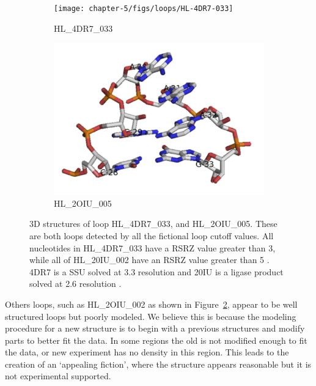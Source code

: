 \begin{figure}
  \begin{subfigure}[b]{0.45\textwidth}
    \texttt{[image: chapter-5/figs/loops/HL-4DR7-033]}
    \caption{HL\_4DR7\_033}
    \label{fig:hl-4dr7-033}
  \end{subfigure}
  \begin{subfigure}[b]{0.45\textwidth}
    \includegraphics[width=\textwidth]{chapter-5/figs/loops/HL-2OIU-005}
    \caption{HL\_2OIU\_005}
    \label{fig:hl-2oiu-002}
  \end{subfigure}
  \caption{3D structures of loop HL\_4DR7\_033, and HL\_2OIU\_005. These are
    both loops detected by all the fictional loop cutoff values. All nucleotides
    in HL\_4DR7\_033 have a RSRZ value greater than 3, while all of HL\_20IU\_002
    have an RSRZ value greater than 5 . 4DR7 is a \TT{} SSU solved at
    3.3\angstrom{} resolution \cite{Demirci2013} and 20IU is a ligase product
      solved at 2.6\angstrom{} resolution \cite{Robertson2007}.}
  \label{fig:fictional-loops}
\end{figure}

Others loops, such as HL\_2OIU\_002 as shown in Figure~\ref{fig:hl-2oiu-002},
appear to be well structured loops but poorly modeled. We believe this is
because the modeling procedure for a new structure is to begin with a previous
structures and modify parts to better fit the data. In some regions the old is
not modified enough to fit the data, or new experiment has no density in this
region. This leads to the creation of an ‘appealing fiction’, where the
structure appears reasonable but it is not experimental supported.

